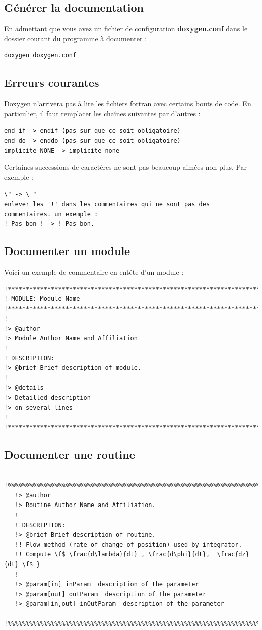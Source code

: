 \documentclass[a4paper,twoside]{article}
\begin{document}
\subsection{Générer la documentation}
En admettant que vous avez un fichier de configuration \textbf{doxygen.conf} dans le dossier courant du programme à documenter : 
\begin{verbatim}
doxygen doxygen.conf
\end{verbatim}

\subsection{Erreurs courantes}
Doxygen n'arrivera pas à lire les fichiers fortran avec certains bouts de code. En particulier, il faut remplacer les chaînes suivantes par d'autres : 
\begin{verbatim}
end if -> endif (pas sur que ce soit obligatoire)
end do -> enddo (pas sur que ce soit obligatoire)
implicite NONE -> implicite none
\end{verbatim}

Certaines successions de caractères ne sont pas beaucoup aimées non plus. Par exemple : 
\begin{verbatim}
\" -> \ "
enlever les '!' dans les commentaires qui ne sont pas des commentaires. un exemple : 
! Pas bon ! -> ! Pas bon.
\end{verbatim}

\subsection{Documenter un module}
Voici un exemple de commentaire en entête d'un module : 
\begin{verbatim}
!******************************************************************************
! MODULE: Module Name
!******************************************************************************
!
!> @author
!> Module Author Name and Affiliation
!
! DESCRIPTION: 
!> @brief Brief description of module.
!
!> @details
!> Detailled description
!> on several lines
!
!******************************************************************************
\end{verbatim}

\subsection{Documenter une routine}
\begin{verbatim}
   !%%%%%%%%%%%%%%%%%%%%%%%%%%%%%%%%%%%%%%%%%%%%%%%%%%%%%%%%%%%%%%%%%%%%%%%%%%%
   !> @author 
   !> Routine Author Name and Affiliation.
   !
   ! DESCRIPTION: 
   !> @brief Brief description of routine. 
   !! Flow method (rate of change of position) used by integrator.
   !! Compute \f$ \frac{d\lambda}{dt} , \frac{d\phi}{dt},  \frac{dz}{dt} \f$ }
   !
   !> @param[in] inParam  description of the parameter
   !> @param[out] outParam  description of the parameter
   !> @param[in,out] inOutParam  description of the parameter 
   !%%%%%%%%%%%%%%%%%%%%%%%%%%%%%%%%%%%%%%%%%%%%%%%%%%%%%%%%%%%%%%%%%%%%%%%%%%% 
\end{verbatim}
\end{document}
